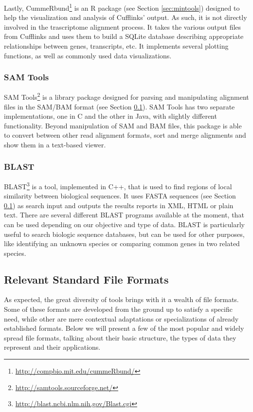 Lastly, CummeRbund\footnote{\url{http://compbio.mit.edu/cummeRbund/}} is an R
package (see Section \ref{sec:mintools}) designed to help the visualization and
analysis of Cufflinks' \rnaseq{} output. As such, it is not directly involved in
the trascriptome alignment process. It takes the various output files from
Cufflinks and uses them to build a SQLite database describing appropriate
relationships between genes, transcripts, etc. It implements several plotting
functions, as well as commonly used data visualizations.

\subsubsection*{SAM Tools}

SAM Tools\footnote{\url{http://samtools.sourceforge.net/}} is a library 
package designed for parsing and manipulating alignment files in the SAM/BAM
format \cite{Li2009} (see Section \ref{sec:formats}). SAM Tools has two separate
implementations, one in C and the other in Java, with slightly different
functionality. Beyond manipulation of SAM and BAM files, this package is able to
convert between other read alignment formats, sort and merge alignments and show
them in a text-based viewer.

\subsubsection*{BLAST}

BLAST\footnote{\url{http://blast.ncbi.nlm.nih.gov/Blast.cgi}} is a tool,
implemented in C++, that is used to find regions of local similarity between
biological sequences. It uses FASTA sequences (see Section \ref{sec:formats}) as
search input and outputs the results reports in XML, HTML or plain text. There
are several different BLAST programs available at the moment, that can be used
depending on our objective and type of data. BLAST is particularly useful to
search biologic sequence databases, but can be used for other purposes, like
identifying an unknown species or comparing common genes in two related
species.

\subsection{Relevant Standard File Formats}\label{sec:formats}

As expected, the great diversity of \rnaseq{} tools brings with it a wealth of
file formats. Some of these formats are developed from the ground up to satisfy
a specific need, while other are mere contextual adaptations or specializations
of already established formats. Below we will present a few of the most popular
and widely spread file formats, talking about their basic structure, the types
of data they represent and their applications.

